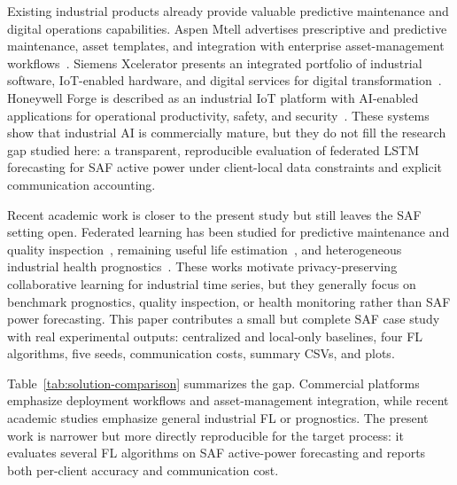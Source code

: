 \documentclass[pdflatex,sn-mathphys-num]{sn-jnl}
\theoremstyle{thmstyleone}%
\theoremstyle{thmstyletwo}%
\theoremstyle{thmstylethree}%
\begin{document}
Existing industrial products already provide valuable predictive maintenance and digital operations capabilities. Aspen Mtell advertises prescriptive and predictive maintenance, asset templates, and integration with enterprise asset-management workflows~\cite{aspentech2026mtell}. Siemens Xcelerator presents an integrated portfolio of industrial software, IoT-enabled hardware, and digital services for digital transformation~\cite{siemens2026xcelerator}. Honeywell Forge is described as an industrial IoT platform with AI-enabled applications for operational productivity, safety, and security~\cite{honeywell2026forge}. These systems show that industrial AI is commercially mature, but they do not fill the research gap studied here: a transparent, reproducible evaluation of federated LSTM forecasting for SAF active power under client-local data constraints and explicit communication accounting.

Recent academic work is closer to the present study but still leaves the SAF setting open. Federated learning has been studied for predictive maintenance and quality inspection~\cite{pruckovskaja2023industrialfl}, remaining useful life estimation~\cite{kamei2023rul}, and heterogeneous industrial health prognostics~\cite{arunan2024matched}. These works motivate privacy-preserving collaborative learning for industrial time series, but they generally focus on benchmark prognostics, quality inspection, or health monitoring rather than SAF power forecasting. This paper contributes a small but complete SAF case study with real experimental outputs: centralized and local-only baselines, four FL algorithms, five seeds, communication costs, summary CSVs, and plots.

Table~\ref{tab:solution-comparison} summarizes the gap. Commercial platforms emphasize deployment workflows and asset-management integration, while recent academic studies emphasize general industrial FL or prognostics. The present work is narrower but more directly reproducible for the target process: it evaluates several FL algorithms on SAF active-power forecasting and reports both per-client accuracy and communication cost.
\end{document}
